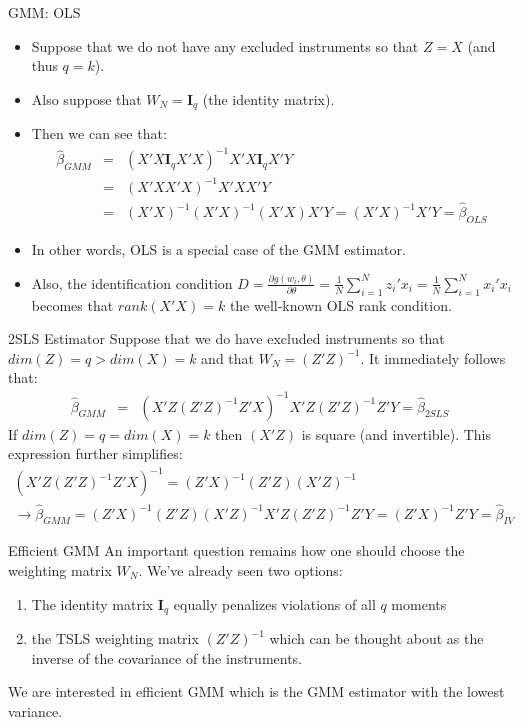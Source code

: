\documentclass[aspectratio=169]{beamer}
\begin{document}
\begin{frame}{GMM: OLS}
\begin{itemize}
\item Suppose that we do not have any excluded instruments so that $Z=X$ (and thus $q=k$). 
\item Also suppose that $W_N = \mathbf{I}_q$ (the identity matrix). 
\item Then we can see that:
\begin{eqnarray*}
\hat{\beta}_{GMM} &=& (X'X \mathbf{I}_q X' X)^{-1} X' X \mathbf{I}_q X'Y\\
 &=& (X'X X' X)^{-1} X' X X'Y\\
 &=& (X'X)^{-1} (X' X)^{-1} (X' X) X'Y =  (X'X)^{-1} X'Y = \hat{\beta}_{OLS}
\end{eqnarray*}

\item In other words, OLS is a special case of the GMM estimator.
\item  Also, the identification condition $D=\frac{\partial g(w_i,\theta)}{\partial \theta} =\frac{1}{N} \sum_{i=1}^N z_i' x_i = \frac{1}{N} \sum_{i=1}^N x_i' x_i$ becomes that $rank(X'X) = k$ the well-known OLS rank condition.\\
\end{itemize}
\end{frame}

\begin{frame}{2SLS Estimator}
Suppose that we do have excluded instruments so that $dim(Z) = q > dim(X) = k$ and that $W_N = (Z'Z)^{-1}$. It immediately follows that:
\begin{eqnarray*}
\hat{\beta}_{GMM} &=& (X'Z (Z'Z)^{-1} Z' X)^{-1} X' Z (Z'Z)^{-1} Z'Y = \hat{\beta}_{2SLS}
\end{eqnarray*}
If $dim(Z) = q = dim(X) = k$ then $(X'Z)$ is square (and invertible). This expression further simplifies:
\begin{eqnarray*}
(X'Z (Z'Z)^{-1} Z' X)^{-1} = (Z'X)^{-1} (Z'Z) (X'Z)^{-1}\\
\rightarrow \hat{\beta}_{GMM} = (Z'X)^{-1} (Z'Z) (X'Z)^{-1}  X' Z (Z'Z)^{-1} Z'Y = (Z'X)^{-1} Z'Y = \hat{\beta}_{IV}
\end{eqnarray*}
\end{frame}

\begin{frame}{Efficient GMM}
An important question remains how one should choose the weighting matrix $W_N$. We've already seen two options: 
\begin{enumerate}
\item The identity matrix $\mathbf{I}_q$ equally penalizes violations of all $q$ moments
\item  the TSLS weighting matrix $(Z'Z)^{-1}$ which can be thought about as the inverse of the covariance of the instruments. 
\end{enumerate}
We are interested in \alert{efficient GMM} which is the GMM estimator with the lowest variance.

\end{frame}
\end{document}
